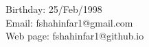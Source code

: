 {
\small
\noindent
\flushright
Birthday: 25/Feb/1998 \\
Email: fshahinfar1@gmail.com \\
Web page: fshahinfar1@github.io\\
}
